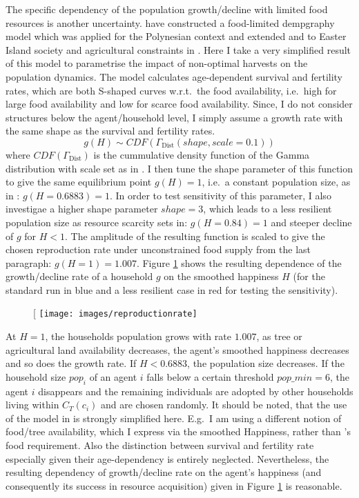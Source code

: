 The specific dependency of the population growth/decline with limited food resources is another uncertainty.
\citet{Lee2008} have constructed a food-limited dempgraphy model which was applied for the Polynesian context \citet{Puleston2008} and extended and to Easter Island society and agricultural constraints in \citet{Puleston2017}. 
Here I take a very simplified result of this model to parametrise the impact of non-optimal harvests on the population dynamics. 
The model calculates age-dependent survival and fertility rates, which are both S-shaped curves w.r.t.\ the food availability, i.e.\ high for large food availability and low for scarce food availability.
Since, I do not consider structures below the agent/household level, I simply assume a growth rate with the same shape as the survival and fertility rates.
\begin{equation}
	g(H) \sim CDF(\Gamma_\text{Dist}(shape, scale=0.1))
\end{equation}
where $CDF(\Gamma_\text{Dist})$ is the cummulative density function of the Gamma distribution with scale set as in \citet{Lee2008}.
I then tune the shape parameter of this function to give the same equilibrium point $g(H)=1$, i.e.\ a constant population size, as in \citet{Puleston2017}: $g(H=0.6883)=1$. 
In order to test sensitivity of this parameter, I also investigae a higher shape parameter $shape=3$\TODO, which leads to a less resilient population size as resource scarcity sets in: $g(H=0.84)=1$ and steeper decline of $g$ for $H<1$.
The amplitude of the resulting function is scaled to give the chosen reproduction rate under unconstrained food supply from the last paragraph: $g(H=1)=1.007$.
Figure \ref{fig:growthrate} shows the resulting dependence of the growth/decline rate of a household $g$ on the smoothed happiness $H$ (for the standard run in blue and a less resilient case in red for testing the sensitivity).
\begin{figure}[
	\centering
	\texttt{[image: images/reproductionrate]}
	\caption{}
	\label{fig:growthrate}
\end{figure}
At $H=1$, the households population grows with rate $1.007$, as tree or agricultural land availability decreases, the agent's smoothed happiness decreases and so does the growth rate. If $H<0.6883$, the population size decreases.
If the household size $pop_i$ of an agent $i$ falls below a certain threshold $pop\_min = 6$, the agent $i$ disappears and the remaining individuals are adopted by other households living within $C_T(c_i)$ and are chosen randomly. \TODO
It should be noted, that the use of the model in \citet{Pulestion2017} is strongly simplified here.
E.g.\ I am using a different notion of food/tree availability, which I express via the smoothed Happiness, rather than \citet{Puleston2017}'s food requirement.
Also the distinction between survival and fertility rate especially given their age-dependency is entirely neglected.
Nevertheless, the resulting dependency of growth/decline rate on the agent's happiness (and consequently its success in resource acquisition) given in Figure \ref{fig:growthrate} is reasonable. 


